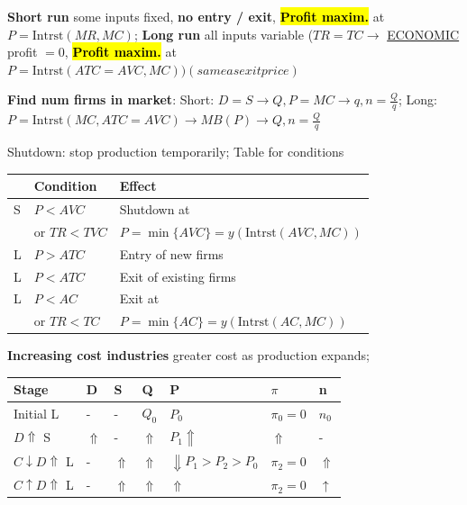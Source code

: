 \documentclass[a4paper]{article}
\begin{document}
\begin{multicols*}{3}
        \textbf{Short run} some inputs fixed, \textbf{no entry / exit}, \hl{\textbf{Profit maxim.}} at $P=\text{Intrst}(MR, MC)$; \; \textbf{Long run} all inputs variable ($TR=TC \to$ \underline{ECONOMIC} profit $= 0$, \hl{\textbf{Profit maxim.}} at $P=\text{Intrst}(ATC=AVC,MC)) (same as exit price)$

        \textbf{Find num firms in market}: Short: $D=S\to Q, P=MC \to q, n=\frac{Q}{q}$; Long: $P=\text{Intrst}(MC, ATC=AVC) \to MB(P) \to Q, n=\frac{Q}{q}$

        Shutdown: stop production temporarily; Table for conditions

        \begin{tabular}{|l|l|l|}
            \hline
              & Condition     & Effect                                   \\\hline
            S & $P < AVC$     & Shutdown at                              \\
              & or $TR < TVC$ & $P=\min\{AVC\}=y(\text{Intrst}(AVC,MC))$ \\ \hline
            L & $P > ATC$     & Entry of new firms                       \\ \hline
            L & $P < ATC$     & Exit of existing firms                   \\ \hline
            L & $P < AC$      & Exit at                                  \\
              & or $TR < TC$  & $P=\min\{AC\}=y(\text{Intrst}(AC,MC))$   \\ \hline
        \end{tabular}

        \textbf{Increasing cost industries} greater cost as production expands;

        \begin{tabular}{|l|l|l|l|l|l|l|}
            \hline
            Stage                     & D          & S          & Q          & P                            & $\pi$      & n          \\\hline
            Initial L                 & -          & -          & $Q_0$      & $P_0$                        & $\pi_0=0$  & $n_0$      \\
            $D\Uparrow$ S             & $\Uparrow$ & -          & $\Uparrow$ & $P_1 \Uparrow$               & $\Uparrow$ & -          \\
            $C\downarrow D\Uparrow$ L & -          & $\Uparrow$ & $\Uparrow$ & $\Downarrow P_1 > P_2 > P_0$ & $\pi_2=0$  & $\Uparrow$ \\\hline
            $C\uparrow D\Uparrow$ L   & -          & $\Uparrow$ & $\Uparrow$ & $\Uparrow$                   & $\pi_2=0$  & $\uparrow$ \\\hline
        \end{tabular}


\end{multicols*}
\end{document}
